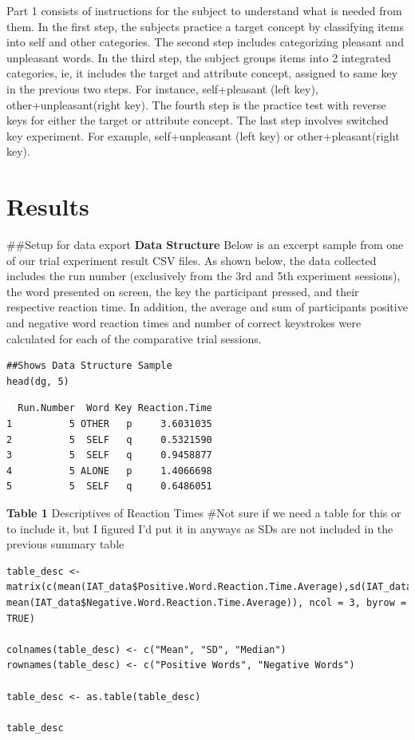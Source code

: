 \documentclass[11pt]{article}
\begin{document}
Part 1 consists of instructions for the subject to understand what is needed from them. In the first step, the subjects practice a target concept by classifying items into self and other categories. The second step includes categorizing pleasant and unpleasant words. In the third step, the subject groups items into 2 integrated categories, ie, it includes the target and attribute concept, assigned to same key in the previous two steps. For instance, self+pleasant (left key), other+unpleasant(right key). The fourth step is the practice test with reverse keys for either the target or attribute concept. The last step involves switched key experiment. For example, self+unpleasant (left key) or other+pleasant(right key). 

\section{Results}
\label{sec:orgca9b8cc}

\#\#Setup for data export
\textbf{Data Structure}
Below is an excerpt sample from one of our trial experiment result CSV files. As shown below, the data collected includes the run number (exclusively from the 3rd and 5th experiment sessions), the word presented on screen, the key the participant pressed, and their respective reaction time. In addition, the average and sum of participants positive and negative word reaction times and number of correct keystrokes were calculated for each of the comparative trial sessions.

\begin{verbatim}
##Shows Data Structure Sample
head(dg, 5)
\end{verbatim}

\begin{verbatim}
  Run.Number  Word Key Reaction.Time
1          5 OTHER   p     3.6031035
2          5  SELF   q     0.5321590
3          5  SELF   q     0.9458877
4          5 ALONE   p     1.4066698
5          5  SELF   q     0.6486051
\end{verbatim}


\textbf{Table 1}
Descriptives of Reaction Times 
\#Not sure if we need a table for this or to include it, but I figured I'd put it in anyways as SDs are not included in the previous summary table

\begin{verbatim}
table_desc <- matrix(c(mean(IAT_data$Positive.Word.Reaction.Time.Average),sd(IAT_data$Positive.Word.Reaction.Time.Average),median(IAT_data$Positive.Word.Reaction.Time.Average),mean(IAT_data$Negative.Word.Reaction.Time.Average),sd(IAT_data$Negative.Word.Reaction.Time.Average), mean(IAT_data$Negative.Word.Reaction.Time.Average)), ncol = 3, byrow = TRUE)

colnames(table_desc) <- c("Mean", "SD", "Median")
rownames(table_desc) <- c("Positive Words", "Negative Words")      

table_desc <- as.table(table_desc)

table_desc
\end{verbatim}
\end{document}
